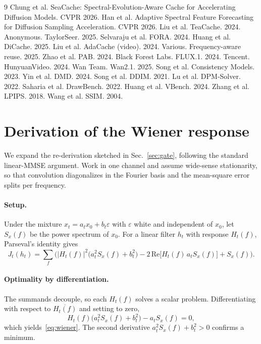 \documentclass[10pt,twocolumn,letterpaper]{article}
\begin{document}
\begin{thebibliography}{9}
 Chung et al. SeaCache: Spectral-Evolution-Aware Cache
  for Accelerating Diffusion Models. CVPR 2026.
 Han et al. Adaptive Spectral Feature Forecasting for
  Diffusion Sampling Acceleration. CVPR 2026.
 Liu et al. TeaCache. 2024.
 Anonymous. TaylorSeer. 2025.
 Selvaraju et al. FORA. 2024.
 Huang et al. DiCache. 2025.
 Liu et al. AdaCache (video). 2024.
 Various. Frequency-aware reuse. 2025.
 Zhao et al. PAB. 2024.
 Black Forest Labs. FLUX.1. 2024.
 Tencent. HunyuanVideo. 2024.
 Wan Team. Wan2.1. 2025.
 Song et al. Consistency Models. 2023.
 Yin et al. DMD. 2024.
 Song et al. DDIM. 2021.
 Lu et al. DPM-Solver. 2022.
 Saharia et al. DrawBench. 2022.
 Huang et al. VBench. 2024.
 Zhang et al. LPIPS. 2018.
 Wang et al. SSIM. 2004.
\end{thebibliography}

\appendix
\section{Derivation of the Wiener response}
\label{app:wiener}

We expand the re-derivation sketched in Sec.~\ref{sec:gate}, following the
standard linear-MMSE argument. Work in one channel and assume wide-sense
stationarity, so that convolution diagonalizes in the Fourier basis and the
mean-square error splits per frequency.

\paragraph{Setup.} Under the mixture $x_t = a_t x_0 + b_t \varepsilon$ with
$\varepsilon$ white and independent of $x_0$, let $S_x(f)$ be the power
spectrum of $x_0$. For a linear filter $h_t$ with response $H_t(f)$,
Parseval's identity gives
\begin{equation}
  J_t(h_t) = \sum_f \Big(
  |H_t(f)|^2\big(a_t^2 S_x(f) + b_t^2\big)
  - 2\,\mathrm{Re}\big[H_t(f)\,a_t S_x(f)\big]
  + S_x(f)\Big).
  \label{eq:app-mse}
\end{equation}

\paragraph{Optimality by differentiation.} The summands decouple, so each
$H_t(f)$ solves a scalar problem. Differentiating with respect to
$\overline{H_t(f)}$ and setting to zero,
\begin{equation}
  H_t(f)\big(a_t^2 S_x(f) + b_t^2\big) - a_t S_x(f) = 0,
\end{equation}
which yields~\eqref{eq:wiener}. The second derivative
$a_t^2 S_x(f) + b_t^2 > 0$ confirms a minimum.
\end{document}
